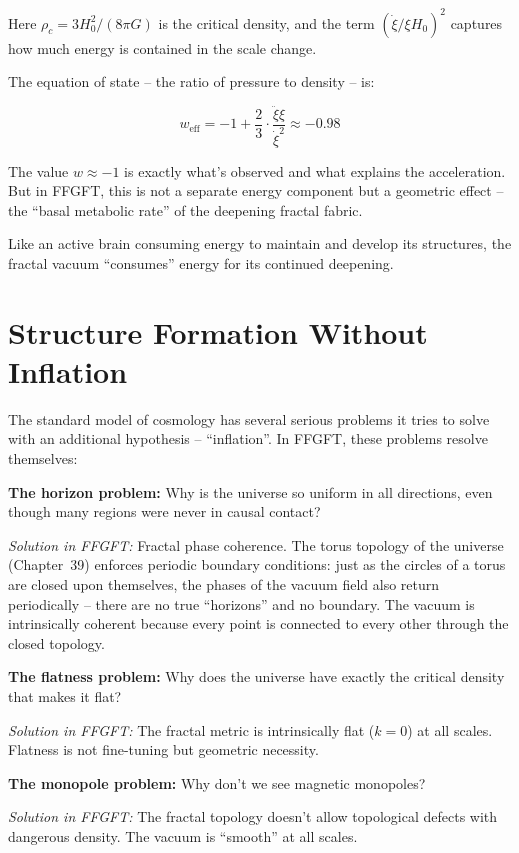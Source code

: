 Here $\rho_c = 3H_0^2/(8\pi G)$ is the critical density, and the term $(\dot{\xi}/\xi H_0)^2$ captures how much energy is contained in the scale change.

The equation of state -- the ratio of pressure to density -- is:

\begin{equation}
w_{\text{eff}} = -1 + \frac{2}{3} \cdot \frac{\ddot{\xi}\xi}{\dot{\xi}^2} \approx -0.98
\end{equation}

The value $w \approx -1$ is exactly what's observed and what explains the acceleration. But in FFGFT, this is not a separate energy component but a geometric effect -- the ``basal metabolic rate'' of the deepening fractal fabric.

Like an active brain consuming energy to maintain and develop its structures, the fractal vacuum ``consumes'' energy for its continued deepening.

\section{Structure Formation Without Inflation}

The standard model of cosmology has several serious problems it tries to solve with an additional hypothesis -- ``inflation''. In FFGFT, these problems resolve themselves:

\textbf{The horizon problem:} Why is the universe so uniform in all directions, even though many regions were never in causal contact?

\textit{Solution in FFGFT:} Fractal phase coherence. The torus topology of the universe (Chapter~39) enforces periodic boundary conditions: just as the circles of a torus are closed upon themselves, the phases of the vacuum field also return periodically -- there are no true ``horizons'' and no boundary. The vacuum is intrinsically coherent because every point is connected to every other through the closed topology.

\textbf{The flatness problem:} Why does the universe have exactly the critical density that makes it flat?

\textit{Solution in FFGFT:} The fractal metric is intrinsically flat ($k=0$) at all scales. Flatness is not fine-tuning but geometric necessity.

\textbf{The monopole problem:} Why don't we see magnetic monopoles?

\textit{Solution in FFGFT:} The fractal topology doesn't allow topological defects with dangerous density. The vacuum is ``smooth'' at all scales.

